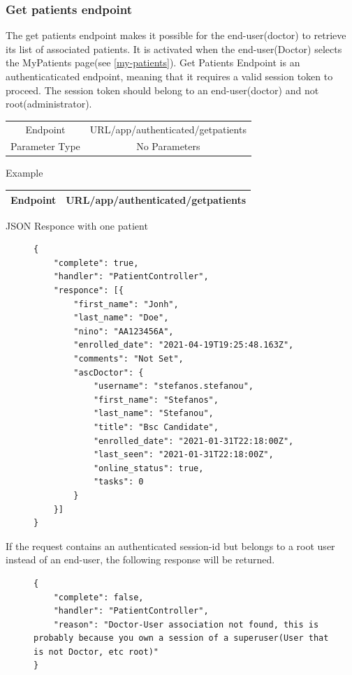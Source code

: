 				\subsubsection{Get patients endpoint}
					The get patients endpoint makes it possible for the end-user(doctor) to retrieve its list of 
					associated patients. It is activated when the end-user(Doctor) selects the MyPatients page(see \ref{my-patients}). 
					Get Patients Endpoint is an authenticaticated endpoint, meaning that it requires a valid session token to proceed. 
					The session token should belong to an end-user(doctor)  and not root(administrator).
					\begin{center}
						\begin{tabular}{ |c|c| } 
							\hline
							Endpoint & {{URL}}/app/authenticated/getpatients\\
							Parameter Type & No Parameters  \\
							\hline
						\end{tabular}
					\end{center}
					Example
					\begin{center}
						\begin{tabular}{ |c|c| } 
							\hline
							Endpoint & {{URL}}/app/authenticated/getpatients\\
							\hline
						\end{tabular}
					\end{center}
					JSON Responce with one patient
					\begin{figure}[H]
						\iftrue
						\begin{lstlisting}[]
{
	"complete": true,
	"handler": "PatientController",
	"responce": [{
		"first_name": "Jonh",
		"last_name": "Doe",
		"nino": "AA123456A",
		"enrolled_date": "2021-04-19T19:25:48.163Z",
		"comments": "Not Set",
		"ascDoctor": {
			"username": "stefanos.stefanou",
			"first_name": "Stefanos",
			"last_name": "Stefanou",
			"title": "Bsc Candidate",
			"enrolled_date": "2021-01-31T22:18:00Z",
			"last_seen": "2021-01-31T22:18:00Z",
			"online_status": true,
			"tasks": 0
		}
	}]
}
						\end{lstlisting}
					\end{figure}
					If the request contains an authenticated session-id but belongs to a root user instead of an end-user, the following response will be returned.
					\begin{figure}[H]
						\iftrue
						\begin{lstlisting}[]
{
	"complete": false,
	"handler": "PatientController",
	"reason": "Doctor-User association not found, this is probably because you own a session of a superuser(User that is not Doctor, etc root)"
}
						\end{lstlisting}
					\end{figure}
